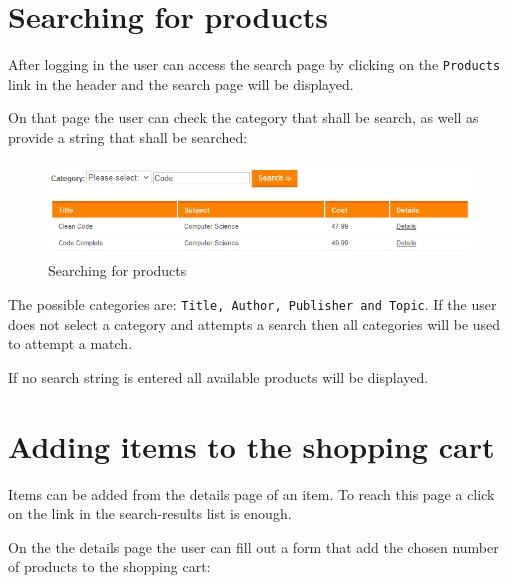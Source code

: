 \section{Searching for products}
\label{sec:searching}

After logging in the user can access the search page by clicking on the \texttt{Products} link in the header and the search page will be displayed.

On that page the user can check the category that shall be search, as well as provide a string that shall be searched:

\begin{figure}[H]
\begin{center}
\includegraphics[width=\textwidth]{gfx/search.png}
\caption{Searching for products}
\label{fig:header}
\end{center}
\end{figure}

The possible categories are: \texttt{Title, Author, Publisher and Topic}. If the user does not select a category and attempts a search then all categories will be used to attempt a match.

If no search string is entered all available products will be displayed.

\section{Adding items to the shopping cart}
\label{sec:adding_items}

Items can be added from the details page of an item. To reach this page a click on the link in the search-results list is enough.

On the the details page the user can fill out a form that add the chosen number of products to the shopping cart:

